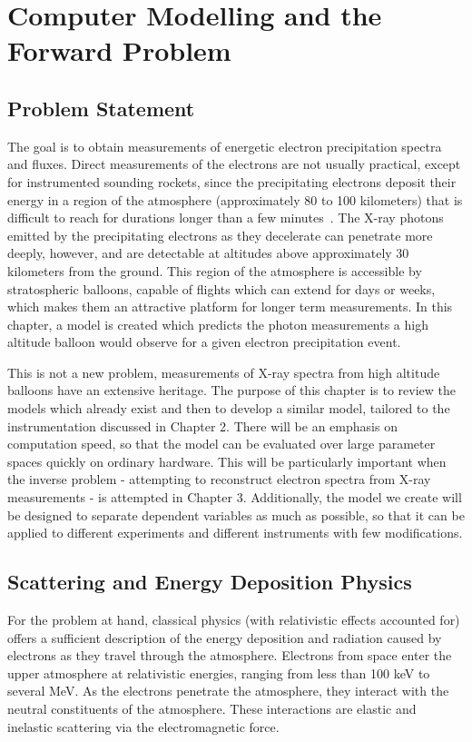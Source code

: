 \chapter{Computer Modelling and the Forward Problem}

\section{Problem Statement}

The goal is to obtain measurements of energetic electron precipitation spectra and fluxes. Direct measurements of the electrons are not usually practical, except for instrumented sounding rockets, since the  precipitating electrons deposit their energy in a region of the atmosphere (approximately 80 to 100 kilometers) that is difficult to reach for durations longer than a few minutes~\citep{Berger1972}. The X-ray photons emitted by the precipitating electrons as they decelerate can penetrate more deeply, however, and are detectable at altitudes above approximately 30 kilometers from the ground. This region of the atmosphere is accessible by stratospheric balloons, capable of flights which can extend for days or weeks, which makes them an attractive platform for longer term measurements. In this chapter, a model is created which predicts the photon measurements a high altitude balloon would observe for a given electron precipitation event. 

This is not a new problem, measurements of X-ray spectra from high altitude balloons have an extensive heritage. The purpose of this chapter is to review the models which already exist and then to develop a similar model, tailored to the instrumentation discussed in Chapter 2. There will be an emphasis on computation speed, so that the model can be evaluated over large parameter spaces quickly on ordinary hardware. This will be particularly important when the inverse problem - attempting to reconstruct electron spectra from X-ray measurements - is attempted in Chapter 3. Additionally, the model we create will be designed to separate dependent variables as much as possible, so that it can be applied to different experiments and different instruments with few modifications. 

\section{Scattering and Energy Deposition Physics}

For the problem at hand, classical physics (with relativistic effects accounted for) offers a sufficient description of the energy deposition and radiation caused by electrons as they travel through the atmosphere. Electrons from space enter the upper atmosphere at relativistic energies, ranging from less than 100 keV to several MeV. As the electrons penetrate the atmosphere, they interact with the neutral constituents of the atmosphere. These interactions are elastic and inelastic scattering via the electromagnetic force. 


